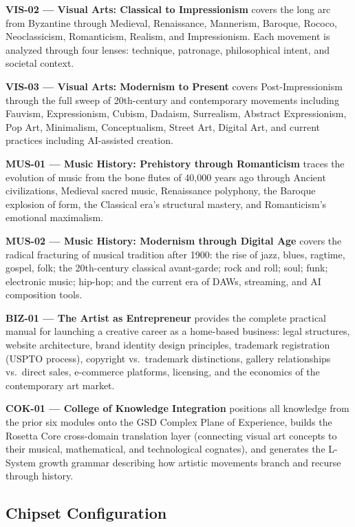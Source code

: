 \documentclass[11pt,letterpaper]{article}
\begin{document}
\textbf{VIS-02 --- Visual Arts: Classical to Impressionism} covers the long arc from Byzantine through Medieval, Renaissance, Mannerism, Baroque, Rococo, Neoclassicism, Romanticism, Realism, and Impressionism. Each movement is analyzed through four lenses: technique, patronage, philosophical intent, and societal context.

\textbf{VIS-03 --- Visual Arts: Modernism to Present} covers Post-Impressionism through the full sweep of 20th-century and contemporary movements including Fauvism, Expressionism, Cubism, Dadaism, Surrealism, Abstract Expressionism, Pop Art, Minimalism, Conceptualism, Street Art, Digital Art, and current practices including AI-assisted creation.

\textbf{MUS-01 --- Music History: Prehistory through Romanticism} traces the evolution of music from the bone flutes of 40,000 years ago through Ancient civilizations, Medieval sacred music, Renaissance polyphony, the Baroque explosion of form, the Classical era's structural mastery, and Romanticism's emotional maximalism.

\textbf{MUS-02 --- Music History: Modernism through Digital Age} covers the radical fracturing of musical tradition after 1900: the rise of jazz, blues, ragtime, gospel, folk; the 20th-century classical avant-garde; rock and roll; soul; funk; electronic music; hip-hop; and the current era of DAWs, streaming, and AI composition tools.

\textbf{BIZ-01 --- The Artist as Entrepreneur} provides the complete practical manual for launching a creative career as a home-based business: legal structures, website architecture, brand identity design principles, trademark registration (USPTO process), copyright vs.\ trademark distinctions, gallery relationships vs.\ direct sales, e-commerce platforms, licensing, and the economics of the contemporary art market.

\textbf{COK-01 --- College of Knowledge Integration} positions all knowledge from the prior six modules onto the GSD Complex Plane of Experience, builds the Rosetta Core cross-domain translation layer (connecting visual art concepts to their musical, mathematical, and technological cognates), and generates the L-System growth grammar describing how artistic movements branch and recurse through history.

\subsection{Chipset Configuration}
\end{document}

